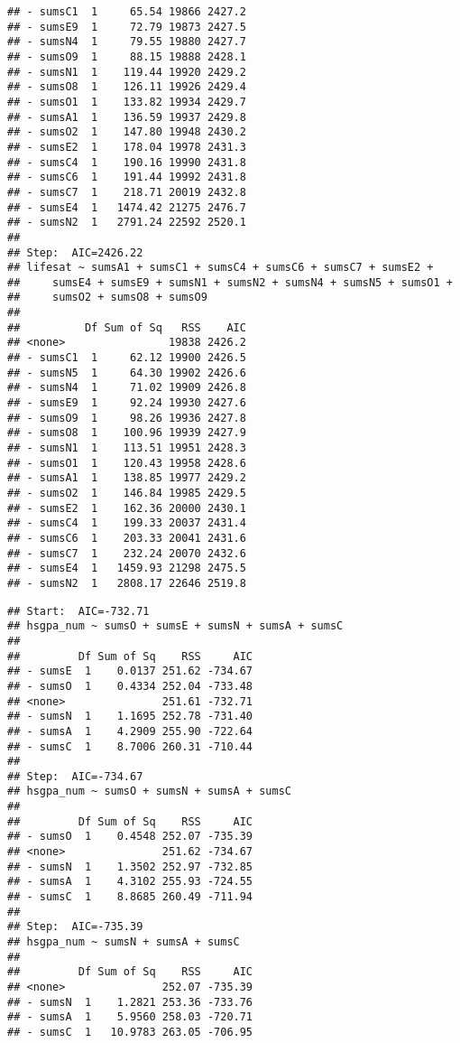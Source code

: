 \documentclass[,man,floatsintext]{apa6}
\begin{document}
\begin{verbatim}
## - sumsC1  1     65.54 19866 2427.2
## - sumsE9  1     72.79 19873 2427.5
## - sumsN4  1     79.55 19880 2427.7
## - sumsO9  1     88.15 19888 2428.1
## - sumsN1  1    119.44 19920 2429.2
## - sumsO8  1    126.11 19926 2429.4
## - sumsO1  1    133.82 19934 2429.7
## - sumsA1  1    136.59 19937 2429.8
## - sumsO2  1    147.80 19948 2430.2
## - sumsE2  1    178.04 19978 2431.3
## - sumsC4  1    190.16 19990 2431.8
## - sumsC6  1    191.44 19992 2431.8
## - sumsC7  1    218.71 20019 2432.8
## - sumsE4  1   1474.42 21275 2476.7
## - sumsN2  1   2791.24 22592 2520.1
## 
## Step:  AIC=2426.22
## lifesat ~ sumsA1 + sumsC1 + sumsC4 + sumsC6 + sumsC7 + sumsE2 + 
##     sumsE4 + sumsE9 + sumsN1 + sumsN2 + sumsN4 + sumsN5 + sumsO1 + 
##     sumsO2 + sumsO8 + sumsO9
## 
##          Df Sum of Sq   RSS    AIC
## <none>                19838 2426.2
## - sumsC1  1     62.12 19900 2426.5
## - sumsN5  1     64.30 19902 2426.6
## - sumsN4  1     71.02 19909 2426.8
## - sumsE9  1     92.24 19930 2427.6
## - sumsO9  1     98.26 19936 2427.8
## - sumsO8  1    100.96 19939 2427.9
## - sumsN1  1    113.51 19951 2428.3
## - sumsO1  1    120.43 19958 2428.6
## - sumsA1  1    138.85 19977 2429.2
## - sumsO2  1    146.84 19985 2429.5
## - sumsE2  1    162.36 20000 2430.1
## - sumsC4  1    199.33 20037 2431.4
## - sumsC6  1    203.33 20041 2431.6
## - sumsC7  1    232.24 20070 2432.6
## - sumsE4  1   1459.93 21298 2475.5
## - sumsN2  1   2808.17 22646 2519.8
\end{verbatim}

\begin{verbatim}
## Start:  AIC=-732.71
## hsgpa_num ~ sumsO + sumsE + sumsN + sumsA + sumsC
## 
##         Df Sum of Sq    RSS     AIC
## - sumsE  1    0.0137 251.62 -734.67
## - sumsO  1    0.4334 252.04 -733.48
## <none>               251.61 -732.71
## - sumsN  1    1.1695 252.78 -731.40
## - sumsA  1    4.2909 255.90 -722.64
## - sumsC  1    8.7006 260.31 -710.44
## 
## Step:  AIC=-734.67
## hsgpa_num ~ sumsO + sumsN + sumsA + sumsC
## 
##         Df Sum of Sq    RSS     AIC
## - sumsO  1    0.4548 252.07 -735.39
## <none>               251.62 -734.67
## - sumsN  1    1.3502 252.97 -732.85
## - sumsA  1    4.3102 255.93 -724.55
## - sumsC  1    8.8685 260.49 -711.94
## 
## Step:  AIC=-735.39
## hsgpa_num ~ sumsN + sumsA + sumsC
## 
##         Df Sum of Sq    RSS     AIC
## <none>               252.07 -735.39
## - sumsN  1    1.2821 253.36 -733.76
## - sumsA  1    5.9560 258.03 -720.71
## - sumsC  1   10.9783 263.05 -706.95
\end{verbatim}
\end{document}
